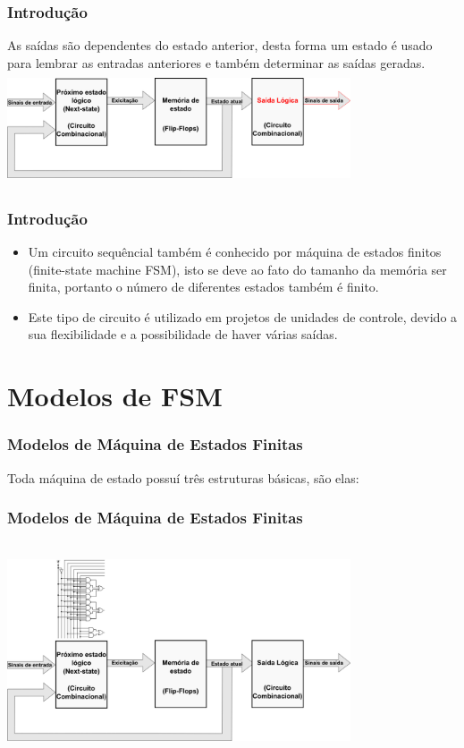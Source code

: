 \documentclass{beamer}
\begin{document}
\begin{frame}
  \frametitle{Introdução}
  As saídas são dependentes do estado anterior, desta forma um estado é usado 
  para lembrar as entradas anteriores e também determinar as saídas geradas. 
  \includegraphics[height = 1.3in, width = 4in]{images/modelo_3.png}
\end{frame}

\begin{frame}
  \frametitle{Introdução}
  \begin{itemize}
    \item Um circuito sequêncial também é conhecido por máquina de estados 
      finitos (finite-state machine FSM), isto se deve ao fato do tamanho da 
      memória ser finita, portanto o número de diferentes estados também é 
      finito.
      \pause
    \item Este tipo de circuito é utilizado em projetos de unidades de 
      controle, devido a sua flexibilidade e a possibilidade de haver várias 
      saídas.
  \end{itemize}
\end{frame}

\section{Modelos de FSM}

\begin{frame}
  \frametitle{Modelos de Máquina de Estados Finitas}
  Toda máquina de estado possuí três estruturas básicas, são elas:
\end{frame}

\begin{frame}
  \frametitle{Modelos de Máquina de Estados Finitas}
  \includegraphics[height = 2.5in, width = 4in]{images/modelo_4.png}
\end{frame}
\end{document}
